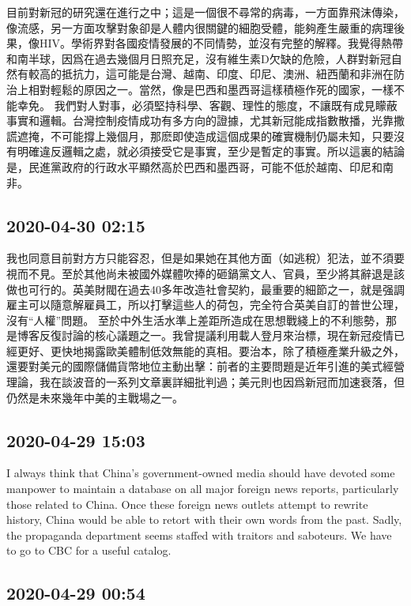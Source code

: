 \documentclass[twocolumn]{ctexart}
\begin{document}
目前對新冠的研究還在進行之中；這是一個很不尋常的病毒，一方面靠飛沫傳染，像流感，另一方面攻擊對象卻是人體内很關鍵的細胞受體，能夠產生嚴重的病理後果，像HIV。學術界對各國疫情發展的不同情勢，並沒有完整的解釋。我覺得熱帶和南半球，因爲在過去幾個月日照充足，沒有維生素D欠缺的危險，人群對新冠自然有較高的抵抗力，這可能是台灣、越南、印度、印尼、澳洲、紐西蘭和非洲在防治上相對輕鬆的原因之一。當然，像是巴西和墨西哥這樣積極作死的國家，一樣不能幸免。 
我們對人對事，必須堅持科學、客觀、理性的態度，不讓既有成見矇蔽事實和邏輯。台灣控制疫情成功有多方向的證據，尤其新冠能成指數散播，光靠撒謊遮掩，不可能撐上幾個月，那麽即使造成這個成果的確實機制仍屬未知，只要沒有明確違反邏輯之處，就必須接受它是事實，至少是暫定的事實。所以這裏的結論是，民進黨政府的行政水平顯然高於巴西和墨西哥，可能不低於越南、印尼和南非。
\subsection*{2020-04-30 02:15}

我也同意目前對方方只能容忍，但是如果她在其他方面（如逃稅）犯法，並不須要視而不見。至於其他尚未被國外媒體吹捧的砸鍋黨文人、官員，至少將其辭退是該做也可行的。英美財閥在過去40多年改造社會契約，最重要的細節之一，就是强調雇主可以隨意解雇員工，所以打擊這些人的荷包，完全符合英美自訂的普世公理，沒有“人權”問題。
至於中外生活水準上差距所造成在思想戰綫上的不利態勢，那是博客反復討論的核心議題之一。我曾提議利用載人登月來治標，現在新冠疫情已經更好、更快地揭露歐美體制低效無能的真相。要治本，除了積極產業升級之外，還要對美元的國際儲備貨幣地位主動出擊：前者的主要問題是近年引進的美式經營理論，我在談波音的一系列文章裏詳細批判過；美元則也因爲新冠而加速衰落，但仍然是未來幾年中美的主戰場之一。
\subsection*{2020-04-29 15:03}

I always think that China's government-owned media should have devoted some manpower to maintain a database on all major foreign news reports, particularly those related to China. Once these foreign news outlets attempt to rewrite history, China would be able to retort with their own words from the past. Sadly, the propaganda department seems staffed with traitors and saboteurs. We have to go to CBC for a useful catalog.
\subsection*{2020-04-29 00:54}
\end{document}
